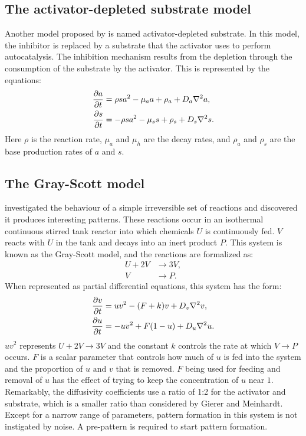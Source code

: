 \subsection{The activator-depleted substrate model}
Another model proposed by \citet{gierer1972} is named activator-depleted substrate. In this model, the inhibitor is replaced by a substrate that the activator uses to perform autocatalysis. The inhibition mechanism results from the depletion through the consumption of the substrate by the activator. This is represented by the equations:
	\begin{equation}
	\begin{aligned} \label{eq:activatorSubstrateRD}
		\frac{\partial a}{\partial t} &= \rho sa^2 - \mu_a a + \rho_a + D_a \nabla^2 a,\\
		\frac{\partial s}{\partial t} &= -\rho sa^2 - \mu_s s + \rho_s + D_s \nabla^2 s.
	\end{aligned}
	\end{equation}
Here $\rho$ is the reaction rate, $\mu_a$ and $\mu_h$ are the decay rates, and $\rho_a$ and $\rho_s$ are the base production rates of $a$ and $s$.

\subsection{The Gray-Scott model}
\citet{gray1984} investigated the behaviour of a simple irreversible set of reactions and discovered it produces interesting patterns. These reactions occur in an isothermal continuous stirred tank reactor into which chemicals $U$ is continuously fed. $V$ reacts with $U$ in the tank and decays into an inert product $P$. This system is known as the Gray-Scott model, and the reactions are formalized as:
	\begin{equation}
	\begin{aligned}
		U + 2V &\to 3V, \\
		V &\to P.
	\end{aligned}
	\end{equation}
When represented as partial differential equations, this system has the form:
	\begin{equation}
	\begin{aligned} \label{eq:grayscottRD}
		\frac{\partial v}{\partial t} &= uv^2 - (F+k)v + D_v \nabla^2 v,\\
		\frac{\partial u}{\partial t} &= -uv^2 + F(1-u) + D_u \nabla^2 u.
	\end{aligned}
	\end{equation}
$uv^2$ represents $U + 2V \to 3V$ and the constant $k$ controls the rate at which $V \to P$ occurs. $F$ is a scalar parameter that controls how much of $u$ is fed into the system and the proportion of $u \text{ and } v$ that is removed. $F$ being used for feeding and removal of $u$ has the effect of trying to keep the concentration of $u$ near $1$. Remarkably, the diffusivity coefficients use a ratio of 1:2 for the activator and substrate, which is a smaller ratio than considered by Gierer and Meinhardt. Except for a narrow range of parameters, pattern formation in this system is not instigated by noise. A pre-pattern is required to start pattern formation. 

